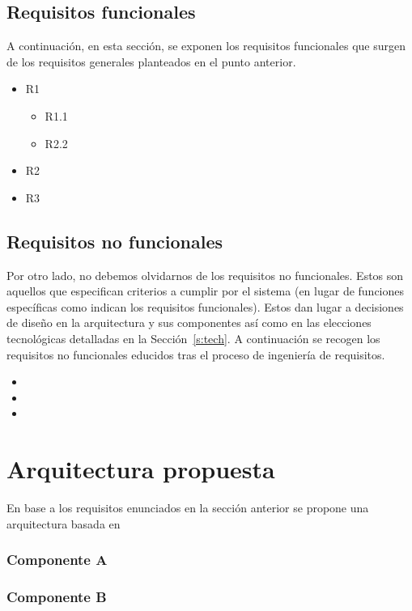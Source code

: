 \subsection{Requisitos funcionales}
A continuación, en esta sección, se exponen los requisitos funcionales que surgen de los requisitos generales planteados en el punto anterior.
\begin{itemize}
\item R1 
\begin{itemize}
\item R1.1
\item R2.2
\end{itemize} 
\item R2 
\item R3 
\end{itemize} 

\subsection{Requisitos no funcionales}
Por otro lado, no debemos olvidarnos de los requisitos no funcionales. Estos son aquellos que especifican criterios a cumplir por el sistema (en lugar de funciones específicas como indican los requisitos funcionales). Estos dan lugar a decisiones de diseño en la arquitectura y sus componentes así como en las elecciones tecnológicas detalladas en la Sección~\ref{s:tech}. A continuación se recogen los requisitos no funcionales educidos tras el proceso de ingeniería de requisitos.

\begin{itemize}
\item 
\item 
\item 
\end{itemize}

\section{Arquitectura propuesta}
\label{s:dev:arch}
En base a los requisitos enunciados en la sección anterior se propone una arquitectura basada en 

\subsubsection*{Componente A}


\subsubsection*{Componente B}



